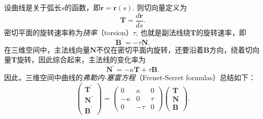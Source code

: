 \documentclass{article}
\begin{document}
设曲线是关于弧长$s$的函数，即$\mathbf{r}=\mathbf{r}(s)$.
则切向量定义为
\begin{equation*}
    \mathbf{T}=\frac{d\mathbf{r}}{ds}.
\end{equation*}
密切平面的旋转速率称为\emph{挠率}（torsion）$\tau$, 也就是副法线绕$\mathbf{T}$的旋转速率，即
\begin{equation}
    \mathbf{B}^{\prime}=-\tau\mathbf{N}.
\end{equation}
在三维空间中，主法线向量$\mathbf{N}$不仅在密切平面内旋转，还要沿着$\mathbf{B}$方向，绕着切向量$\mathbf{T}$旋转，因此综合起来，主法线的变化率为
\begin{equation}
    \mathbf{N}^{\prime}=-\kappa\mathbf{T}+\tau\mathbf{B}.
\end{equation}
因此，三维空间中曲线的\emph{弗勒内-塞雷方程}（Frenet-Serret formulas）总结如下：
\begin{equation}
    \begin{pmatrix}
        \mathbf{T}^{\prime} \\
        \mathbf{N}^{\prime} \\
        \mathbf{B}^{\prime}
    \end{pmatrix}
    =
    \begin{pmatrix}
        0 & \kappa & 0 \\
        -\kappa & 0 & \tau \\
        0 & -\tau & 0
    \end{pmatrix}
    \begin{pmatrix}
        \mathbf{T} \\
        \mathbf{N} \\
        \mathbf{B}
    \end{pmatrix}.
\end{equation}

%
%
\end{document}
